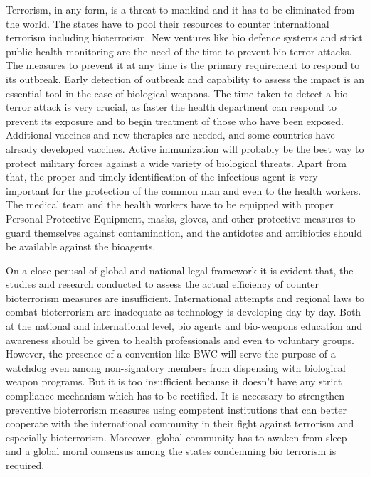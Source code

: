 \begin{multicols}{2}
\noi
Terrorism, in any form, is a threat to mankind and it has to be eliminated from the world. The
states have to pool their resources to counter international terrorism including bioterrorism.
New ventures like bio defence systems and strict public health monitoring are the need of the
time to prevent bio-terror attacks. The measures to prevent it at any time is the primary
requirement to respond to its outbreak. Early detection of outbreak and capability to assess
the impact is an essential tool in the case of biological weapons. The time taken to detect a
bio-terror attack is very crucial, as faster the health department can respond to prevent its
exposure and to begin treatment of those who have been exposed. Additional vaccines and
new therapies are needed, and some countries have already developed vaccines. Active
immunization will probably be the best way to protect military forces against a wide variety
of biological threats. Apart from that, the proper and timely identification of the infectious
agent is very important for the protection of the common man and even to the health workers.
The medical team and the health workers have to be equipped with proper Personal
Protective Equipment, masks, gloves, and other protective measures to guard themselves
against contamination, and the antidotes and antibiotics should be available against the bioagents.

\noi
On a close perusal of global and national legal framework it is evident that, the studies and
research conducted to assess the actual efficiency of counter bioterrorism measures are
insufficient. International attempts and regional laws to combat bioterrorism are inadequate
as technology is developing day by day. Both at the national and international level, bio
agents and bio-weapons education and awareness should be given to health professionals and
even to voluntary groups. However, the presence of a convention like BWC will serve the
purpose of a watchdog even among non-signatory members from dispensing with biological
weapon programs. But it is too insufficient because it doesn’t have any strict compliance
mechanism which has to be rectified. It is necessary to strengthen preventive bioterrorism
measures using competent institutions that can better cooperate with the international community in their fight against terrorism and especially bioterrorism. Moreover, global community has to awaken from sleep and a global moral consensus among the states condemning bio terrorism is required.

\end{multicols}
